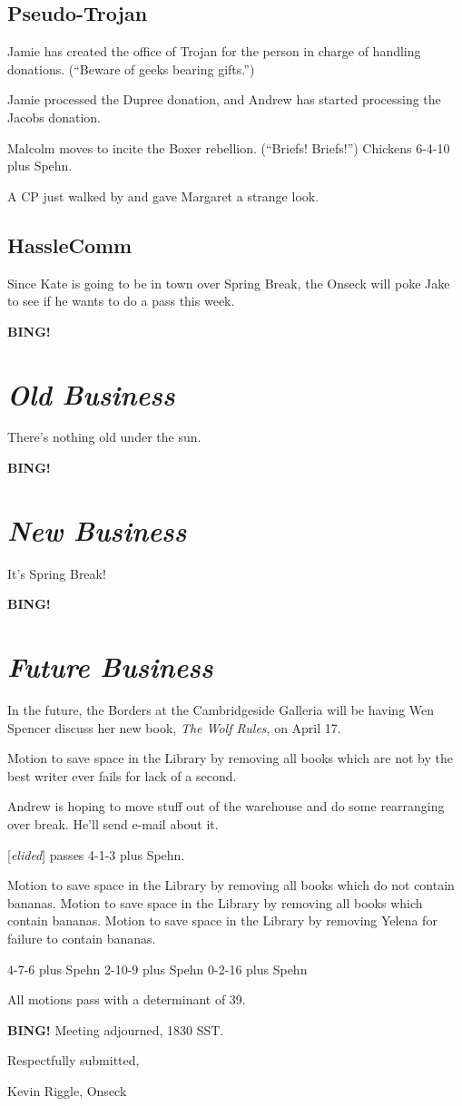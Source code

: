 \documentclass[10pt]{article}
\newcommand{\bing}{{\bf BING!} }
\newcommand{\goto}[1]{\bing \vskip 12pt \section*{{\em{#1}}}}
\newcommand{\ps}{ plus Spehn\xspace}
\begin{document}

\subsection*{Pseudo-Trojan}
Jamie has created the office of Trojan for the person in charge of handling donations.  (``Beware
of geeks bearing gifts.'')

Jamie processed the Dupree donation, and Andrew has started processing the Jacobs donation.

Malcolm moves to incite the Boxer rebellion.  (``Briefs!  Briefs!'')  Chickens 6-4-10\ps.

A CP just walked by and gave Margaret a strange look.

\subsection*{HassleComm}
Since Kate is going to be in town over Spring Break, the Onseck will poke Jake to see if he wants
to do a pass this week.



\goto{Old Business}

There's nothing old under the sun.

\goto{New Business}

It's Spring Break!

\goto{Future Business}

In the future, the Borders at the Cambridgeside Galleria will be having Wen Spencer discuss her
new book, \emph{The Wolf Rules}, on April 17.

Motion to save space in the Library by removing all books which are not by the best writer ever
fails for lack of a second.

Andrew is hoping to move stuff out of the warehouse and do some rearranging over break.  He'll
send e-mail about it.

[\emph{elided}] passes 4-1-3\ps.

Motion to save space in the Library by removing all books which do not contain bananas.
Motion to save space in the Library by removing all books which contain bananas.
Motion to save space in the Library by removing Yelena for failure to contain bananas.

4-7-6\ps
2-10-9\ps
0-2-16\ps

All motions pass with a determinant of 39.


\bing
\noindent
Meeting adjourned, 1830 SST.

\vspace{18pt}

\centerline{Respectfully submitted,}
\centerline{Kevin Riggle, Onseck}
\end{document}
